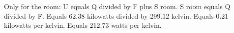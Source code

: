 Only for the room:  
U equals Q divided by F plus S room.  
S room equals Q divided by F.  
Equals 62.38 kilowatts divided by 299.12 kelvin.  
Equals 0.21 kilowatts per kelvin.  
Equals 212.73 watts per kelvin.